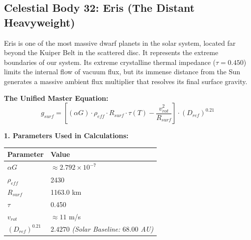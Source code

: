 \documentclass[11pt, a4paper]{article}
\begin{document}
\clearpage
\subsection{Celestial Body 32: Eris (The Distant Heavyweight)}
  Eris is one of the most massive dwarf planets in the solar system, located far beyond the Kuiper Belt in the scattered disc. It represents the extreme boundaries of our system. Its extreme crystalline thermal impedance ($\tau = 0.450$) limits the internal flow of vacuum flux, but its immense distance from the Sun generates a massive ambient flux multiplier that resolves its final surface gravity.

  \vspace{0.5em}
  \noindent \textbf{The Unified Master Equation:}
  $$ g_{surf} = \left[ (\alpha G) \cdot \rho_{eff} \cdot R_{surf} \cdot \tau(T) - \frac{v_{rot}^2}{R_{surf}} \right] \cdot (D_{ref})^{0.21} $$

  \vspace{0.5em}
  \noindent \textbf{1. Parameters Used in Calculations:} \\[0.5em]
  \begingroup
  \renewcommand{\arraystretch}{1.3}
  \hspace*{2em}
  \begin{tabular}{|l|l|}
    \hline
    \textbf{Parameter} & \textbf{Value} \\ \hline
    $\alpha G$ & $\approx 2.792 \times 10^{-7}$ \\ \hline
    $\rho_{eff}$ & 2430 \\ \hline
    $R_{surf}$ & 1163.0 km \\ \hline
    $\tau$ & 0.450 \\ \hline
    $v_{rot}$ & $\approx 11$ m/s \\ \hline
    $(D_{ref})^{0.21}$ & $2.4270$ \textit{(Solar Baseline: $68.00$ AU)} \\ \hline
  \end{tabular}
  \endgroup
\end{document}
